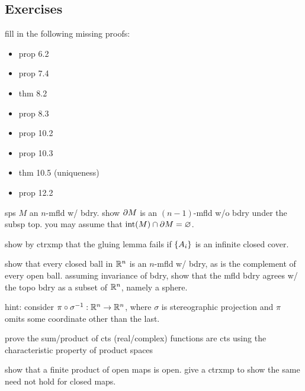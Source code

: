 \subsection{Exercises}

\begin{exr}[source=Primary Source Material]
    fill in the following missing proofs:
    \begin{itemize}
        \item prop 6.2
        \item prop 7.4
        \item thm 8.2
        \item prop 8.3
        \item prop 10.2
        \item prop 10.3
        \item thm 10.5 (uniqueness)
        \item prop 12.2
    \end{itemize}
\end{exr}

\begin{exr}[source=Primary Source Material]
    sps $M$ an $n$-mfld w/ bdry. show $\partial M$ is an $(n-1)$-mfld w/o bdry under
    the subsp top. you may assume that $\operatorname{int}(M) \cap \partial M = \varnothing$.
\end{exr}

\begin{exr}[source=Primary Source Material]
    show by ctrxmp that the gluing lemma fails if $\left\{{A_{i}}\right\}$ is an infinite
    closed cover.
\end{exr}

\newpage
\begin{exr}[source=Primary Source Material]
    show that every closed ball in $\mathbb{R}^{n}$ is an $n$-mfld w/ bdry, as is the
    complement of every open ball. assuming invariance of bdry, show that the
    mfld bdry agrees w/ the topo bdry as a subset of $\mathbb{R}^{n}$, namely a sphere.

    hint: consider $\pi\circ\sigma^{-1}:\mathbb{R}^{n}\rightarrow\mathbb{R}^{n}$, where $\sigma$ is
    stereographic projection and $\pi$ omits some coordinate other than the last.
\end{exr}

\begin{exr}[source=Primary Source Material]
    prove the sum/product of cts (real/complex) functions are cts using the
    characteristic property of product spaces
\end{exr}

\begin{exr}[source=Primary Source Material]
    show that a finite product of open maps is open. give a ctrxmp to show the
    same need not hold for closed maps.
\end{exr}

